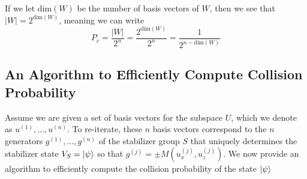 \documentclass[11pt]{article}
\theoremstyle{definition}
\theoremstyle{plain}
\begin{document}
If we let $\text{dim}(W)$ be the number of basis vectors of $W$, then we see that $|W| = 2^{\text{dim}(W)}$, meaning we can write
\begin{equation}\label{simplify_9}
  P_c = \frac{|W|}{2^n} = \frac{2^{\text{dim}(W)}}{2^n} = \frac{1}{2^{n - \text{dim}(W)}}
\end{equation}

\subsection{An Algorithm to Efficiently Compute Collision Probability}
Assume we are given a set of basis vectors for the subspace $U$, which we denote as $u^{(1)}, \ldots, u^{(n)}$. To re-iterate, these $n$ basis vectors correspond to the $n$ generators $g^{(1)}, \ldots, g^{(n)}$ of the stabilizer group $S$ that uniquely determines the stabilizer state $V_S = \ket{\psi}$ so that $g^{(j)} = \pm M(u_x^{(j)}, u_z^{(j)})$. We now provide an algorithm to efficiently compute the collision probability of the state $\ket{\psi}$\\
\end{document}

